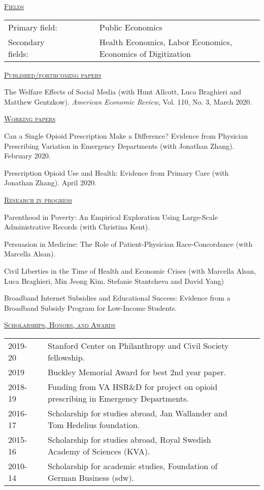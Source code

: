 \documentclass[letterpaper,11pt]{article}
\begin{document}
\underline {\textsc{Fields}}

\noindent\begin{tabular}{@{}l@{}lll@{}cl}
Primary field: &&&&& Public Economics \\
Secondary fields: &&&&& Health Economics, Labor Economics, Economics of Digitization
\end{tabular}


\bigskip
 
 
 \underline {\textsc{Published/forthcoming papers}}
 
The Welfare Effects of Social Media (with Hunt Allcott, Luca Braghieri and Matthew Gentzkow). \textit{American Economic Review}, Vol. 110, No. 3, March 2020.

\medskip

\underline {\textsc{Working papers}}

Can a Single Opioid Prescription Make a Difference? Evidence from Physician Prescribing Variation in Emergency Departments (with Jonathan Zhang). February 2020.

Prescription Opioid Use and Health: Evidence from Primary Care (with Jonathan Zhang). April 2020.


\medskip


\underline {\textsc{Research in progress}}

Parenthood in Poverty: An Empirical Exploration Using Large-Scale Administrative Records (with Christina Kent).

Persuasion in Medicine: The Role of Patient-Physician Race-Concordance (with Marcella Alsan).

Civil Liberties in the Time of Health and Economic Crises (with Marcella Alsan, Luca Braghieri, Min Jeong Kim, Stefanie Stantcheva and David Yang)

Broadband Internet Subsidies and Educational Success: Evidence from a Broadband Subsidy Program for Low-Income Students.

 
 \medskip


\underline {\textsc{Scholarships, Honors, and Awards}}

\begin{tabular}{@{}l@{}cl@{}cl}
2019-20 & & Stanford Center on Philanthropy and Civil Society fellowship. \\
2019 & & Buckley Memorial Award for best 2nd year paper. \\
2018-19 & & Funding from VA HSR\&D for project on opioid prescribing in Emergency Departments. \\
2016-17 & & Scholarship for studies abroad, Jan Wallander and Tom Hedelius foundation. \\
2015-16 & & Scholarship for studies abroad, Royal Swedish Academy of Sciences (KVA).  \\
2010-14 & & Scholarship for academic studies, Foundation of German Business (sdw).
\end{tabular}
 
\end{document}
